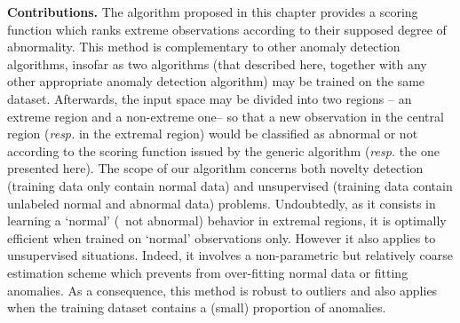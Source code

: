 \noindent
\textbf{Contributions.}
The algorithm proposed  in this chapter provides a scoring function which ranks
extreme observations according to their supposed degree of abnormality. This method is complementary to other  anomaly detection
algorithms, insofar as  two algorithms (that described  here, together with any
other  appropriate anomaly detection algorithm) may be trained on the same dataset.
Afterwards, the input space may be divided into two regions -- an
extreme region and a non-extreme one-- so that a new
observation in the central region (\emph{resp.} in the extremal
region) would be classified as abnormal or
not according  to the scoring function issued by the generic algorithm
(\emph{resp.} the one  presented
here). 
The scope of our algorithm concerns both novelty detection (training data only contain normal data) and
unsupervised (training data contain unlabeled normal and abnormal data) problems. Undoubtedly, as it consists in learning a
`normal' (\ie\ not abnormal) behavior in extremal regions, it is optimally efficient when
trained on `normal' observations only. %
However it also applies to  unsupervised situations. %
Indeed, it involves a non-parametric but relatively coarse estimation
scheme which prevents from over-fitting normal data or fitting anomalies.
As a consequence, this method is robust to outliers and also applies when the training dataset contains a (small) proportion of anomalies. 
%
%

